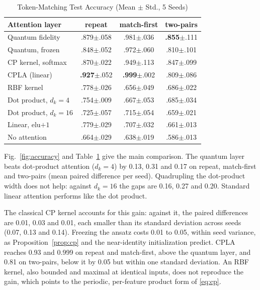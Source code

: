 \documentclass[conference]{IEEEtran}
\newcommand{\cpla}{CPLA}
\begin{document}
\begin{table}[t]
\caption{Token-Matching Test Accuracy (Mean $\pm$ Std., 5 Seeds)}
\label{tab:accuracy}
\centering
\setlength{\tabcolsep}{2.5pt}
\begin{tabular}{@{}lccc@{}}
\toprule
Attention layer & repeat & match-first & two-pairs \\
\midrule
Quantum fidelity       & .879$\pm$.058 & .981$\pm$.036 & \textbf{.855}$\pm$.111 \\
Quantum, frozen        & .848$\pm$.052 & .972$\pm$.060 & .810$\pm$.101 \\
CP kernel, softmax     & .870$\pm$.022 & .949$\pm$.113 & .847$\pm$.099 \\
\cpla{} (linear)       & \textbf{.927}$\pm$.052 & \textbf{.999}$\pm$.002 & .809$\pm$.086 \\
RBF kernel             & .778$\pm$.026 & .656$\pm$.049 & .686$\pm$.022 \\
Dot product, $d_k{=}4$ & .754$\pm$.009 & .667$\pm$.053 & .685$\pm$.034 \\
Dot product, $d_k{=}16$& .725$\pm$.057 & .715$\pm$.054 & .659$\pm$.021 \\
Linear, elu$+1$        & .779$\pm$.029 & .707$\pm$.032 & .661$\pm$.013 \\
No attention           & .664$\pm$.029 & .638$\pm$.019 & .586$\pm$.013 \\
\bottomrule
\end{tabular}
\end{table}

Fig.~\ref{fig:accuracy} and Table~\ref{tab:accuracy} give the main comparison. The quantum layer beats dot-product attention ($d_k=4$) by 0.13, 0.31 and 0.17 on repeat, match-first and two-pairs (mean paired difference per seed). Quadrupling the dot-product width does not help: against $d_k=16$ the gaps are 0.16, 0.27 and 0.20. Standard linear attention performs like the dot product.

The classical CP kernel accounts for this gain: against it, the paired differences are 0.01, 0.03 and 0.01, each smaller than its standard deviation across seeds (0.07, 0.13 and 0.14). Freezing the ansatz costs 0.01 to 0.05, within seed variance, as Proposition~\ref{prop:cp} and the near-identity initialization predict. \cpla{} reaches 0.93 and 0.999 on repeat and match-first, above the quantum layer, and 0.81 on two-pairs, below it by 0.05 but within one standard deviation. An RBF kernel, also bounded and maximal at identical inputs, does not reproduce the gain, which points to the periodic, per-feature product form of \eqref{eq:cp}.
\end{document}
